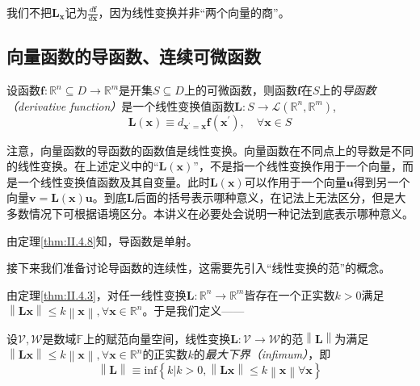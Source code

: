 \documentclass[main.tex]{subfiles}
\begin{document}
我们不把$\mathbf{L}_{\mathbf{x}}$记为$\frac{d\mathbf{f}}{d\mathbf{x}}$，因为线性变换并非“两个向量的商”。

\subsection{向量函数的导函数、连续可微函数}
\begin{definition}[向量函数的导函数]\label{def:II.4.15}
    设函数$\mathbf{f}:\mathbb{R}^n\subseteq D\rightarrow\mathbb{R}^m$是开集$S\subseteq D$上的可微函数，则函数$\mathbf{f}$在$S$上的\emph{导函数（derivative function）}是一个线性变换值函数$\mathbf{L}:S\rightarrow\mathcal{L}\left(\mathbb{R}^n,\mathbb{R}^m\right)$,
    \[\mathbf{L}\left(\mathbf{x}\right)\equiv d_{\mathbf{x}^\prime=\mathbf{x}}\mathbf{f}\left(\mathbf{x}^\prime\right),\quad\forall\mathbf{x}\in S\]
\end{definition}

注意，向量函数的导函数的函数值是线性变换。向量函数在不同点上的导数是不同的线性变换。在上述定义中的“$\mathbf{L}\left(\mathbf{x}\right)$”，不是指一个线性变换作用于一个向量，而是一个线性变换值函数及其自变量。此时$\mathbf{L}\left(\mathbf{x}\right)$可以作用于一个向量$\mathbf{u}$得到另一个向量$\mathbf{v}=\mathbf{L}\left(\mathbf{x}\right)\mathbf{u}$。到底$\mathbf{L}$后面的括号表示哪种意义，在记法上无法区分，但是大多数情况下可根据语境区分。本讲义在必要处会说明一种记法到底表示哪种意义。

由定理\ref{thm:II.4.8}知，导函数是单射。

接下来我们准备讨论导函数的连续性，这需要先引入“线性变换的范”的概念。

由定理\ref{thm:II.4.3}，对任一线性变换$\mathbf{L}:\mathbb{R}^n\rightarrow\mathbb{R}^m$皆存在一个正实数$k>0$满足$\left\|\mathbf{Lx}\right\|\leq k\left\|\mathbf{x}\right\|,\forall\mathbf{x}\in\mathbb{R}^n$。于是我们定义——
\begin{definition}[线性变换的范]\label{def:II.4.16}
    设$\mathcal{V},\mathcal{W}$是数域$\mathbb{F}$上的赋范向量空间，线性变换$\mathbf{L}:\mathcal{V}\rightarrow\mathcal{W}$的范$\left\|\mathbf{L}\right\|$为满足$\left\|\mathbf{Lx}\right\|\leq k\left\|\mathbf{x}\right\|,\forall\mathbf{x}\in\mathbb{R}^n$的正实数$k$的\emph{最大下界（infimum）}，即
    \[\left\|\mathbf{L}\right\|\equiv\mathrm{inf}\left\{k|k>0,\left\|\mathbf{Lx}\right\|\leq k\left\|\mathbf{x}\right\|\forall\mathbf{x}\right\}\]
\end{definition}
\end{document}
